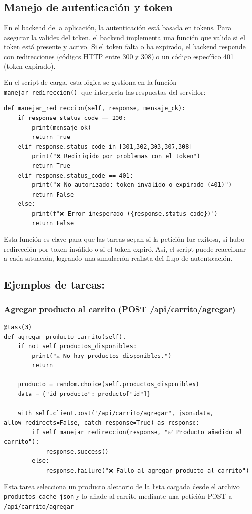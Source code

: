 \documentclass[10pt]{book}
\begin{document}
\subsection{Manejo de autenticación y token}

En el backend de la aplicación, la autenticación está basada en tokens. Para asegurar la validez del token, el backend implementa una función que valida si el token está presente y activo. Si el token falta o ha expirado, el backend responde con redirecciones (códigos HTTP entre 300 y 308) o un código específico 401 (token expirado).

En el script de carga, esta lógica se gestiona en la función \texttt{manejar\_redireccion()}, que interpreta las respuestas del servidor:

\begin{lstlisting}[style=pythonclean, caption={Gestión de redirecciones y expiración de token}]
def manejar_redireccion(self, response, mensaje_ok):
    if response.status_code == 200:
        print(mensaje_ok)
        return True
    elif response.status_code in [301,302,303,307,308]:
        print("❌ Redirigido por problemas con el token")
        return True
    elif response.status_code == 401:
        print("❌ No autorizado: token inválido o expirado (401)")
        return False
    else:
        print(f"❌ Error inesperado ({response.status_code})")
        return False
\end{lstlisting}

Esta función es clave para que las tareas sepan si la petición fue exitosa, si hubo redirección por token inválido o si el token expiró. Así, el script puede reaccionar a cada situación, logrando una simulación realista del flujo de autenticación.


\subsection{Ejemplos de tareas:}

\subsubsection{Agregar producto al carrito (POST /api/carrito/agregar)}

\begin{lstlisting}[style=pythonclean, caption={Tarea para agregar un producto al carrito}]
@task(3)
def agregar_producto_carrito(self):
    if not self.productos_disponibles:
        print("⚠️ No hay productos disponibles.")
        return

    producto = random.choice(self.productos_disponibles)
    data = {"id_producto": producto["id"]}

    with self.client.post("/api/carrito/agregar", json=data, allow_redirects=False, catch_response=True) as response:
        if self.manejar_redireccion(response, "✅ Producto añadido al carrito"):
            response.success()
        else:
            response.failure("❌ Fallo al agregar producto al carrito")
\end{lstlisting}
Esta tarea selecciona un producto aleatorio de la lista cargada desde el archivo \texttt{productos\_cache.json} y lo añade al carrito mediante una petición POST a \texttt{/api/carrito/agregar}
\end{document}
